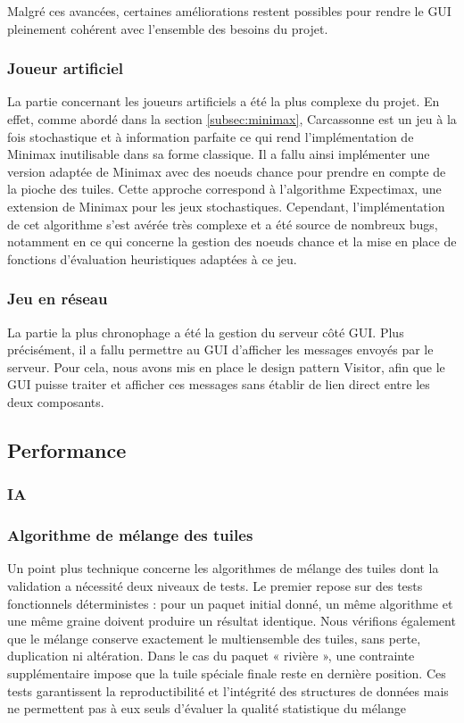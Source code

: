 \documentclass[11pt]{article}
\begin{document}
Malgré ces avancées, certaines améliorations restent possibles pour rendre le GUI pleinement cohérent avec l’ensemble des besoins du projet.

\subsubsection{Joueur artificiel}

La partie concernant les joueurs artificiels a été la plus complexe du projet. En effet, comme abordé dans la section \ref{subsec:minimax}, Carcassonne est un jeu à la fois stochastique et à information parfaite
ce qui rend l’implémentation de Minimax inutilisable dans sa forme classique.
Il a fallu ainsi implémenter une version adaptée de Minimax avec des noeuds chance pour prendre en compte de la pioche des tuiles. 
Cette approche correspond à l’algorithme Expectimax, une extension de Minimax pour les jeux stochastiques.
Cependant, l’implémentation de cet algorithme s’est avérée très complexe et a été source de nombreux bugs, notamment en ce qui concerne la gestion des noeuds chance et la mise en place de fonctions d’évaluation heuristiques adaptées à ce jeu.


\subsubsection{Jeu en réseau}


La partie la plus chronophage a été la gestion du serveur côté GUI. Plus précisément, il a fallu permettre au GUI d’afficher les messages envoyés par le serveur. 
Pour cela, nous avons mis en place le design pattern Visitor, afin que le GUI puisse traiter et afficher ces messages sans établir de lien direct entre les deux composants.

\subsection{Performance}

\subsubsection{IA}

\subsubsection{Algorithme de mélange des tuiles}
\label{subsubsec:melange}

Un point plus technique concerne les algorithmes de mélange des tuiles dont la validation a nécessité deux niveaux de tests. 
Le premier repose sur des tests fonctionnels déterministes : pour un paquet initial donné, un même algorithme et une même graine doivent produire un résultat identique. 
Nous vérifions également que le mélange conserve exactement le multiensemble des tuiles, sans perte, duplication ni altération. 
Dans le cas du paquet « rivière », une contrainte supplémentaire impose que la tuile spéciale finale reste en dernière position. 
Ces tests garantissent la reproductibilité et l’intégrité des structures de données mais ne permettent pas à eux seuls d’évaluer la qualité statistique du mélange
\end{document}
